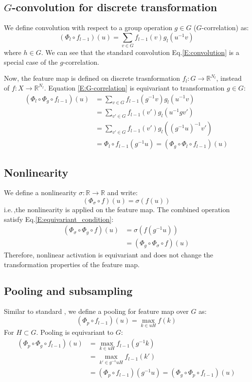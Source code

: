 \documentclass{IEEEtran}
\begin{document}
\subsection*{$G$-convolution for discrete transformation}
We define convolution with respect to a group operation $g\in G$ ($G$-correlation) as:
\begin{equation}
    (\Phi_l \circ f_{l-1})(u) = \sum_{v\in G} f_{l-1}(v) g_l(u^{-1}v) \label{E:G-correlation}
\end{equation}
where $h \in G$.
We can see that the standard convolution Eq.\eqref{E:convolution} is a special case of the $g$-correlation.

Now, the feature map is defined on discrete 
trasnformation $f_l\colon G\to \mathbb{R}^{N_l}$, instead of $f\colon X\to \mathbb{R}^{N_l}$. 
Equation \eqref{E:G-correlation} is equivariant to transformation $g \in G$:
\begin{align*}
    (\Phi_l \circ \Phi_g \circ f_{l-1})(u) 
        &= \sum_{v\in G} f_{l-1}(g^{-1}v) g_l(u^{-1}v) \\
        &= \sum_{v'\in G} f_{l-1}(v') g_l(u^{-1}gv') \\
        &= \sum_{v'\in G} f_{l-1}(v') g_l((g^{-1}u)^{-1}v') \\
        &= \Phi_l \circ f_{l-1} (g^{-1}u) = (\Phi_g \circ \Phi_l \circ f_{l-1})(u)
\end{align*}

\subsection*{Nonlinearity}
We define a nonlinearity $\sigma\colon \mathbb{R} \to \mathbb{R}$ and write:
\begin{equation}
    (\Phi_{\sigma} \circ f) (u) = \sigma(f(u))
\end{equation}
i.e.\,,the nonlinearity is applied on the feature map. 
The combined operation satisfy Eq.\eqref{E:equivariant_condition}: 
\begin{align*}
    (\Phi_{\sigma} \circ \Phi_g \circ f)(u) &= \sigma(f(g^{-1}u)) \\
    &= (\Phi_g \circ \Phi_{\sigma} \circ f)(u)
\end{align*}
Therefore, nonlinear activation is equivariant 
and does not change the transformation properties of the feature map.

\subsection*{Pooling and subsampling}
Similar to standard , we define a pooling for feature map over $G$ as:
\begin{equation}
    (\Phi_p \circ f_{l-1})(u) = \max_{k \in uH} f(k)
\end{equation}
For $H \subset G$. Pooling is equivariant to $G$:
\begin{align*}
    (\Phi_p \circ \Phi_g \circ f_{l-1})(u) &= \max_{k \in uH} f_{l-1}(g^{-1}k) \\
        & = \max_{k'\in g^{-1}uH} f_{l-1}(k') \\
        &= (\Phi_p \circ f_{l-1})(g^{-1}u) = (\Phi_g \circ \Phi_p \circ f_{l-1})(u)
\end{align*}
\end{document}
